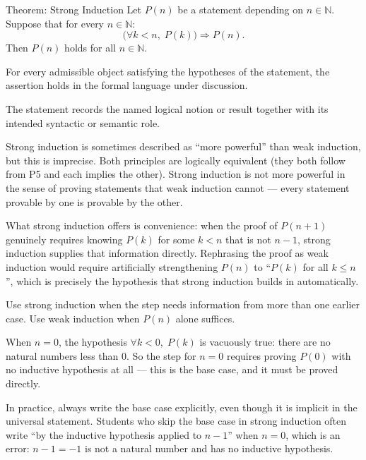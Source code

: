 \begin{propositionbox}{Theorem: Strong Induction}
Let $P(n)$ be a statement depending on $n \in \mathbb{N}$.
Suppose that for every $n \in \mathbb{N}$:
\[
\Big(\forall k < n,\; P(k)\Big) \Rightarrow P(n).
\]
Then $P(n)$ holds for all $n \in \mathbb{N}$.
\end{propositionbox}
\begin{remark*}
For every admissible object satisfying the hypotheses of the statement, the
assertion holds in the formal language under discussion.
\end{remark*}

\begin{remark*}[Interpretation]
The statement records the named logical notion or result together with its
intended syntactic or semantic role.
\end{remark*}


\begin{remark}
Strong induction is sometimes described as ``more powerful'' than weak
induction, but this is imprecise. Both principles are logically
equivalent (they both follow from P5 and each implies the other).
Strong induction is not more powerful in the sense of proving statements
that weak induction cannot --- every statement provable by one is
provable by the other.

What strong induction offers is convenience: when the proof of $P(n+1)$
genuinely requires knowing $P(k)$ for some $k < n$ that is not $n-1$,
strong induction supplies that information directly. Rephrasing the proof
as weak induction would require artificially strengthening $P(n)$ to
``$P(k)$ for all $k \leq n$'', which is precisely the hypothesis that
strong induction builds in automatically.

Use strong induction when the step needs information from more than one
earlier case. Use weak induction when $P(n)$ alone suffices.
\end{remark}

\begin{remark}
When $n = 0$, the hypothesis $\forall k < 0,\; P(k)$ is vacuously
true: there are no natural numbers less than $0$. So the step for
$n = 0$ requires proving $P(0)$ with no inductive hypothesis at all
--- this is the base case, and it must be proved directly.

In practice, always write the base case explicitly, even though it is
implicit in the universal statement. Students who skip the base case in
strong induction often write ``by the inductive hypothesis applied to
$n-1$'' when $n = 0$, which is an error: $n - 1 = -1$ is not a natural
number and has no inductive hypothesis.
\end{remark}

